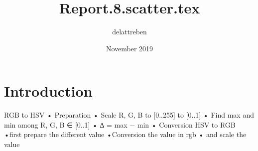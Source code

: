 \documentclass{article}
\title{Report.8.scatter.tex}
\author{delattreben }
\date{November 2019}
\begin{document}
\maketitle

\section{Introduction}
RGB to HSV
\newline
• Preparation
\newline
• Scale R, G, B to [0..255] to [0..1]
\newline
• Find max and min among R, G, B ∈ [0..1]
\newline
• ∆ = max − min
\newline
• Conversion
\newline
\newline
 HSV to RGB
 \newline
 •first prepare the different value
  \newline
 •Conversion the value in rgb
  \newline
 • and scale the value
  \newline
\end{document}

